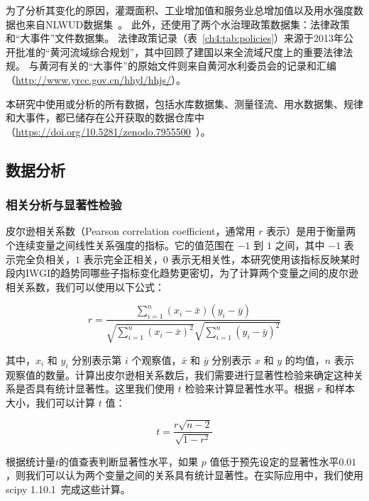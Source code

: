 为了分析其变化的原因，灌溉面积、工业增加值和服务业总增加值以及用水强度数据也来自NLWUD数据集~\cite{zhou2020}。
此外，还使用了两个水治理政策数据集：法律政策和``大事件''文件数据集。
法律政策记录（表~\ref{ch4:tab:policies}）来源于2013年公开批准的``黄河流域综合规划''，其中回顾了建国以来全流域尺度上的重要法律法规。
与黄河有关的``大事件''的原始文件则来自黄河水利委员会的记录和汇编（\url{http://www.yrcc.gov.cn/hhyl/hhjs/}）。

本研究中使用或分析的所有数据，包括水库数据集、测量径流、用水数据集、规律和大事件，都已储存在公开获取的数据仓库中（\url{https://doi.org/10.5281/zenodo.7955500}~\cite{shuang_song_2023_7955500}）。



\subsection{数据分析}

\subsubsection{相关分析与显著性检验}

皮尔逊相关系数（Pearson correlation coefficient，通常用 $r$ 表示）是用于衡量两个连续变量之间线性关系强度的指标。它的值范围在 $-1$ 到 $1$ 之间，其中 $-1$ 表示完全负相关，$1$ 表示完全正相关，$0$ 表示无相关性，本研究使用该指标反映某时段内IWGI的趋势同哪些子指标变化趋势更密切，为了计算两个变量之间的皮尔逊相关系数，我们可以使用以下公式\cite{freedman2007}：

\begin{equation}
    r = \frac{\sum_{i=1}^{n}(x_i - \bar{x})(y_i - \bar{y})}{\sqrt{\sum_{i=1}^{n}{(x_i - \bar{x})}^2}\sqrt{\sum_{i=1}^{n}{(y_i - \bar{y})}^2}}
\end{equation}

其中，$x_i$ 和 $y_i$ 分别表示第 $i$ 个观察值，$\bar{x}$ 和 $\bar{y}$ 分别表示 $x$ 和 $y$ 的均值，$n$ 表示观察值的数量。计算出皮尔逊相关系数后，我们需要进行显著性检验来确定这种关系是否具有统计显著性。这里我们使用 $t$ 检验来计算显著性水平。根据 $r$ 和样本大小，我们可以计算 $t$ 值\cite{freedman2007}：

\begin{equation}
    t = \frac{r\sqrt{n-2}}{\sqrt{1-r^2}}
\end{equation}

根据统计量$t$的值查表判断显著性水平，如果 $p$ 值低于预先设定的显著性水平$0.01$，则我们可以认为两个变量之间的关系具有统计显著性。在实际应用中，我们使用 scipy 1.10.1~\cite{2020SciPy-NMeth}完成这些计算。

